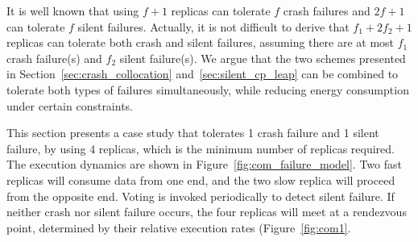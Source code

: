 It is well known that using $f+1$ replicas can tolerate $f$ crash failures and $2f+1$ can tolerate $f$ silent failures. Actually, it is not difficult to derive that $f_1 + 2f_2 + 1$ replicas can tolerate both crash and silent failures, assuming there are at most $f_1$ crash failure(s) and $f_2$ silent failure(s). We argue that the two schemes presented in Section~\ref{sec:crash_collocation} and~\ref{sec:silent_cp_leap} can be combined to tolerate both types of failures simultaneously, while reducing energy consumption under certain constraints. 


This section presents a case study that tolerates 1 crash failure and 1 silent failure, by using 4 replicas, which is the minimum number of replicas required. The execution dynamics are shown in Figure~\ref{fig:com_failure_model}. 
Two fast replicas will consume data from one end, and the two slow replica will proceed from the opposite end. Voting is invoked periodically to detect silent failure. If neither crash nor silent failure occurs, the four replicas will meet at a rendezvous point, determined by their relative execution rates (Figure~\ref{fig:com1}. 

